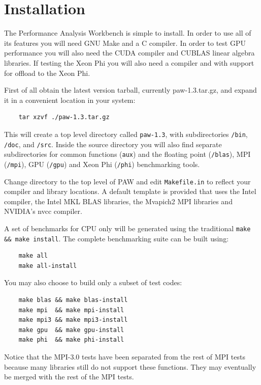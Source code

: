 \documentclass[10pt,a4paper]{report}
\begin{document}
\tableofcontents

\chapter{Installation}
The Performance Analysis Workbench is simple to install. In order to use all of its features you will need GNU Make and a C compiler. In order to test GPU performance you will also need the CUDA compiler and CUBLAS linear algebra libraries. If testing the Xeon Phi you will also need a compiler and with support for offload to the Xeon Phi.

First of all obtain the latest version tarball, currently paw-1.3.tar.gz, and expand it in a convenient location in your system:

\begin{verbatim}
    tar xzvf ./paw-1.3.tar.gz
\end{verbatim}

This will create a top level directory called \verb+paw-1.3+, with subdirectories \verb+/bin+, \verb+/doc+, and \verb+/src+. Inside the source directory you will also find separate subdirectories for common functions (\verb+aux+) and the floating point (\verb+/blas+), MPI (\verb+/mpi+), GPU (\verb+/gpu+) and Xeon Phi (\verb+/phi+) benchmarking tools.

Change directory to the top level of PAW and edit \verb+Makefile.in+ to reflect your compiler and library locations. A default template is provided that uses the Intel compiler, the Intel MKL BLAS libraries, the Mvapich2 MPI libraries and NVIDIA's nvcc compiler.

A set of benchmarks for CPU only will be generated using the traditional \texttt{make \&\& make install}. The complete benchmarking suite can be built using:

\begin{verbatim}
    make all
    make all-install
\end{verbatim}

You may also choose to build only a subset of test codes:

\begin{verbatim}
    make blas && make blas-install
    make mpi  && make mpi-install
    make mpi3 && make mpi3-install
    make gpu  && make gpu-install
    make phi  && make phi-install
\end{verbatim}

Notice that the MPI-3.0 tests have been separated from the rest of MPI tests because many libraries still do not support these functions. They may eventually be merged with the rest of the MPI tests.
\end{document}
